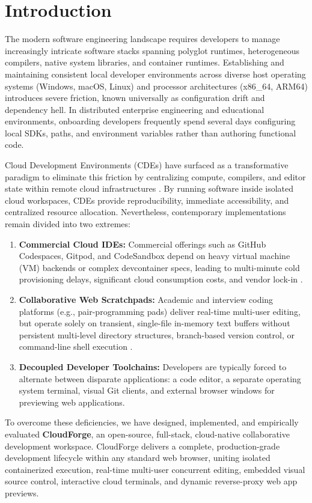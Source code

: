 \documentclass[conference]{IEEEtran}
\begin{document}
\section{Introduction}

The modern software engineering landscape requires developers to manage increasingly intricate software stacks spanning polyglot runtimes, heterogeneous compilers, native system libraries, and container runtimes. Establishing and maintaining consistent local developer environments across diverse host operating systems (Windows, macOS, Linux) and processor architectures (x86\_64, ARM64) introduces severe friction, known universally as configuration drift and dependency hell. In distributed enterprise engineering and educational environments, onboarding developers frequently spend several days configuring local SDKs, paths, and environment variables rather than authoring functional code.

Cloud Development Environments (CDEs) have surfaced as a transformative paradigm to eliminate this friction by centralizing compute, compilers, and editor state within remote cloud infrastructures \cite{rp3}. By running software inside isolated cloud workspaces, CDEs provide reproducibility, immediate accessibility, and centralized resource allocation. Nevertheless, contemporary implementations remain divided into two extremes:
\begin{enumerate}
    \item \textbf{Commercial Cloud IDEs:} Commercial offerings such as GitHub Codespaces, Gitpod, and CodeSandbox depend on heavy virtual machine (VM) backends or complex devcontainer specs, leading to multi-minute cold provisioning delays, significant cloud consumption costs, and vendor lock-in \cite{rp4}.
    \item \textbf{Collaborative Web Scratchpads:} Academic and interview coding platforms (e.g., pair-programming pads) deliver real-time multi-user editing, but operate solely on transient, single-file in-memory text buffers without persistent multi-level directory structures, branch-based version control, or command-line shell execution \cite{rp2, rp5}.
    \item \textbf{Decoupled Developer Toolchains:} Developers are typically forced to alternate between disparate applications: a code editor, a separate operating system terminal, visual Git clients, and external browser windows for previewing web applications.
\end{enumerate}

To overcome these deficiencies, we have designed, implemented, and empirically evaluated \textbf{CloudForge}, an open-source, full-stack, cloud-native collaborative development workspace. CloudForge delivers a complete, production-grade development lifecycle within any standard web browser, uniting isolated containerized execution, real-time multi-user concurrent editing, embedded visual source control, interactive cloud terminals, and dynamic reverse-proxy web app previews.
\end{document}
